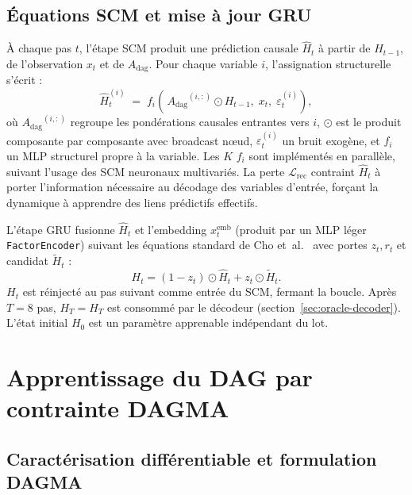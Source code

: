 \documentclass[14pt,a4paper,openany]{extreport}
\theoremstyle{definition}
\newcommand{\Adag}{\ensuremath{A_{\mathrm{dag}}}}
\newcommand{\HT}{\ensuremath{H_T}}
\newcommand{\Lrec}{\ensuremath{\mathcal{L}_{\mathrm{rec}}}}
\begin{document}
\subsection{Équations SCM et mise à jour GRU}
\label{ssec:oracle-rcn-scm}

À chaque pas $t$, l'étape SCM produit une prédiction causale $\hat{H}_t$ à partir de $H_{t-1}$, de l'observation $x_t$ et de $\Adag$. Pour chaque variable $i$, l'assignation structurelle s'écrit :
\begin{equation}
  \hat{H}_t^{(i)} \;=\; f_i\!\left(\, \Adag^{(i,:)} \odot H_{t-1},\; x_t,\; \varepsilon_t^{(i)} \right),
  \label{eq:scm-update}
\end{equation}
où $\Adag^{(i,:)}$ regroupe les pondérations causales entrantes vers $i$, $\odot$ est le produit composante par composante avec broadcast nœud, $\varepsilon_t^{(i)}$ un bruit exogène, et $f_i$ un MLP structurel propre à la variable. Les $K$ $f_i$ sont implémentés en parallèle, suivant l'usage des SCM neuronaux multivariés. La perte $\Lrec$ contraint $\hat{H}_t$ à porter l'information nécessaire au décodage des variables d'entrée, forçant la dynamique à apprendre des liens prédictifs effectifs.

L'étape GRU fusionne $\hat{H}_t$ et l'embedding $x_t^{\mathrm{emb}}$ (produit par un MLP léger \texttt{FactorEncoder}) suivant les équations standard de Cho et~al.~\cite{cho_gru_2014} avec portes $z_t, r_t$ et candidat $\tilde{H}_t$ :
\begin{equation}
  H_t = (1 - z_t) \odot \hat{H}_t + z_t \odot \tilde{H}_t.
  \label{eq:gru-h}
\end{equation}
$H_t$ est réinjecté au pas suivant comme entrée du SCM, fermant la boucle. Après $T=8$ pas, $\HT = H_T$ est consommé par le décodeur (section~\ref{sec:oracle-decoder}). L'état initial $H_0$ est un paramètre apprenable indépendant du lot.

\section{Apprentissage du DAG par contrainte DAGMA}
\label{sec:oracle-dagma}

\subsection{Caractérisation différentiable et formulation DAGMA}
\label{ssec:oracle-dag-problem}
\end{document}
